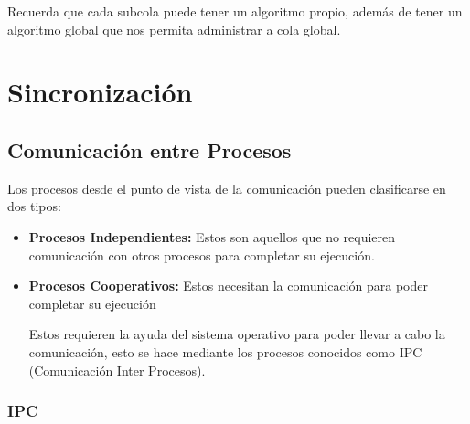 \documentclass[12pt, fleqn]{report}                             %
\begin{document}
                Recuerda que cada subcola puede tener un algoritmo propio, además de tener un algoritmo
                global que nos permita administrar a cola global.





    \chapter{Sincronización}


        \clearpage
        \section{Comunicación entre Procesos}

            Los procesos desde el punto de vista de la comunicación pueden clasificarse en dos tipos:

            \begin{itemize}
                \item \textbf{Procesos Independientes:}
                    Estos son aquellos que no requieren comunicación con otros procesos para completar
                    su ejecución.

                \item \textbf{Procesos Cooperativos:}
                    Estos necesitan la comunicación para poder completar su ejecución

                    Estos requieren la ayuda del sistema operativo para poder llevar a cabo la comunicación,
                    esto se hace mediante los procesos conocidos como IPC (Comunicación Inter Procesos).
            \end{itemize}

        \clearpage
        \subsection{IPC}
\end{document}
